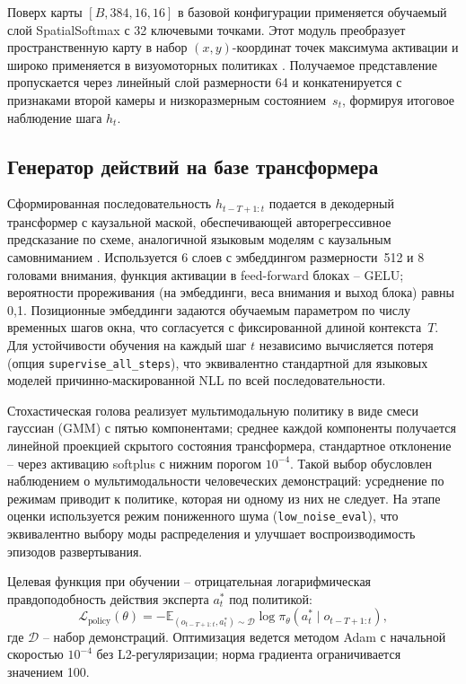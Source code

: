 Поверх карты $[B, 384, 16, 16]$ в базовой конфигурации применяется обучаемый слой SpatialSoftmax с 32 ключевыми точками. Этот модуль преобразует пространственную карту в набор $(x, y)$-координат точек максимума активации и широко применяется в визуомоторных политиках \cite{mandlekar2021robomimic}. Получаемое представление пропускается через линейный слой размерности 64 и конкатенируется с признаками второй камеры и низкоразмерным состоянием~$s_t$, формируя итоговое наблюдение шага $h_t$.

\subsection{Генератор действий на базе трансформера}
\label{subsec:bc-policy}

Сформированная последовательность $h_{t-T+1:t}$ подается в декодерный трансформер с каузальной маской, обеспечивающей авторегрессивное предсказание по схеме, аналогичной языковым моделям с каузальным самовниманием \cite{vaswani2017attention, radford2018improving}. Используется 6 слоев с эмбеддингом размерности~512 и 8 головами внимания, функция активации в feed-forward блоках -- GELU; вероятности прореживания (на эмбеддинги, веса внимания и выход блока) равны 0{,}1. Позиционные эмбеддинги задаются обучаемым параметром по числу временных шагов окна, что согласуется с фиксированной длиной контекста~$T$. Для устойчивости обучения на каждый шаг $t$ независимо вычисляется потеря (опция \texttt{supervise\_all\_steps}), что эквивалентно стандартной для языковых моделей причинно-маскированной NLL по всей последовательности.

Стохастическая голова реализует мультимодальную политику в виде смеси гауссиан (GMM) с пятью компонентами; среднее каждой компоненты получается линейной проекцией скрытого состояния трансформера, стандартное отклонение -- через активацию softplus с нижним порогом $10^{-4}$. Такой выбор обусловлен наблюдением \cite{mandlekar2021robomimic} о мультимодальности человеческих демонстраций: усреднение по режимам приводит к политике, которая ни одному из них не следует. На этапе оценки используется режим пониженного шума (\texttt{low\_noise\_eval}), что эквивалентно выбору моды распределения и улучшает воспроизводимость эпизодов развертывания.

Целевая функция при обучении -- отрицательная логарифмическая правдоподобность действия эксперта $a_t^{\ast}$ под политикой:
\begin{equation}
    \label{eq:bc-loss}
    \mathcal{L}_{\text{policy}}(\theta) = -\mathbb{E}_{(o_{t-T+1:t}, a_t^{\ast}) \sim \mathcal{D}}
    \log \pi_\theta\!\left(a_t^{\ast} \mid o_{t-T+1:t}\right),
\end{equation}
где $\mathcal{D}$ -- набор демонстраций. Оптимизация ведется методом Adam с начальной скоростью $10^{-4}$ без L2-регуляризации; норма градиента ограничивается значением 100.

